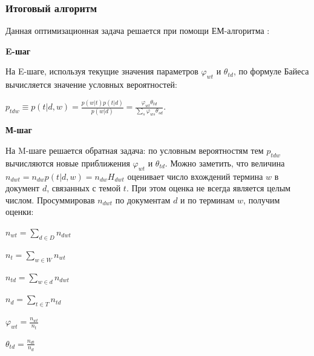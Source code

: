 \documentclass[12pt]{article}
\renewcommand{\phi}{\varphi}
\begin{document}
\subsubsection{Итоговый алгоритм}

Данная оптимизационная задача решается при помощи ЕМ-алгоритма \cite{plsadef2}:

\noindent\textbf{E-шаг}

На E-шаге, используя текущие значения параметров $\phi_{wt}$ и $\theta_{td}$, по формуле Байеса вычисляется значение условных вероятностей:

$p_{tdw} \equiv p(t|d,w) = \frac {p(w|t)p(t|d)} {p(w|d)} = \frac {\varphi_{wt}\theta_{td}} {\sum_s\varphi_{ws}\theta_{sd}}$.

\noindent\textbf{М-шаг}

На M-шаге решается обратная задача: по условным вероятностям тем $p_{tdw}$ вычисляются новые приближения $\phi_{wt}$ и $\theta_{td}$.
Можно заметить, что величина $n_{dwt}=n_{dw}p(t|d,w)=n_{dw}H_{dwt}$ оценивает число вхождений термина $w$ в документ $d$, связанных с темой $t$. При этом оценка не всегда является целым числом. Просуммировав $n_{dwt}$ по документам $d$ и по терминам $w$, получим оценки:

$n_{wt}=\sum_{d \in D} n_{dwt}$

$n_t = \sum_{w \in W}n_{wt}$

$n_{td}=\sum_{w \in d} n_{dwt}$

$n_d = \sum_{t \in T}n_{td}$

$\phi_{wt}=\frac{n_{wt}}{n_t}$

$\theta_{td} = \frac{n_{dt}}{n_{d}}$
\end{document}
